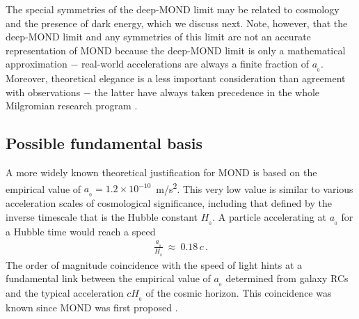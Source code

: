 \documentclass[fleqn,usenatbib,useAMS]{mnras} %
\begin{document}
The special symmetries of the deep-MOND limit may be related to cosmology and the presence of dark energy, which we discuss next. Note, however, that the deep-MOND limit and any symmetries of this limit are not an accurate representation of MOND because the deep-MOND limit is only a mathematical approximation $-$ real-world accelerations are always a finite fraction of $a_{_0}$. Moreover, theoretical elegance is a less important consideration than agreement with observations $-$ the latter have always taken precedence in the whole Milgromian research program \citep[see also][]{Hossenfelder_2018}.



\subsection{Possible fundamental basis}
\label{Possible_fundamental_basis}

A more widely known theoretical justification for MOND is based on the empirical value of $a_{_0} = 1.2 \times 10^{-10}$~m/s\textsuperscript{2}. This very low value is similar to various acceleration scales of cosmological significance, including that defined by the inverse timescale that is the Hubble constant $H_{_0}$. A particle accelerating at $a_{_0}$ for a Hubble time would reach a speed 
\begin{eqnarray}
	\frac{a_{_0}}{H_{_0}} ~\approx~ 0.18 \, c \, .
	\label{a0_cH0_coincidence}
\end{eqnarray}
The order of magnitude coincidence with the speed of light hints at a fundamental link between the empirical value of $a_{_0}$ determined from galaxy RCs and the typical acceleration $cH_{_0}$ of the cosmic horizon. This coincidence was known since MOND was first proposed \citep[see the introduction to][]{Milgrom_1983}.
\end{document}

